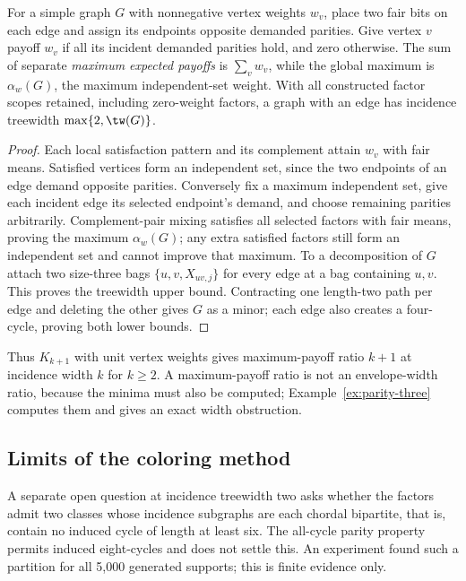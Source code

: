 \begin{proposition}\label{prop:independent-payoffs}
For a simple graph $G$ with nonnegative vertex weights $w_v$, place two
fair bits on each edge and assign its endpoints opposite demanded
parities. Give vertex $v$ payoff $w_v$ if all its incident demanded
parities hold, and zero otherwise. The sum of separate \emph{maximum
expected payoffs} is $\sum_vw_v$, while the global maximum is
$\alpha_w(G)$, the maximum independent-set weight. With all constructed
factor scopes retained, including zero-weight factors, a graph with
an edge has incidence treewidth $\max\{2,\tw(G)\}$.
\end{proposition}
\begin{proof}
Each local satisfaction pattern and its complement attain $w_v$ with
fair means. Satisfied vertices form an independent set, since the two
endpoints of an edge demand opposite parities. Conversely fix a maximum
independent set, give each incident edge its selected endpoint's demand,
and choose remaining parities arbitrarily. Complement-pair mixing
satisfies all selected factors with fair means, proving the maximum
$\alpha_w(G)$; any extra satisfied factors still form an independent
set and cannot improve that maximum.
To a decomposition of $G$ attach two size-three bags $\{u,v,X_{uv,j}\}$
for every edge at a bag containing $u,v$. This proves the treewidth
upper bound. Contracting one length-two path per edge and deleting
the other gives $G$ as a minor; each edge also creates a four-cycle,
proving both lower bounds.
\end{proof}
Thus $K_{k+1}$ with unit vertex weights gives maximum-payoff ratio $k+1$
at incidence width $k$ for $k\ge2$. A maximum-payoff ratio is not an
envelope-width ratio, because the minima must also be computed;
Example~\ref{ex:parity-three} computes them and gives an exact width
obstruction.

\subsection{Limits of the coloring method}\label{subsec:width-three-boundary}
A separate open question at incidence treewidth two asks whether the
factors admit two classes whose incidence subgraphs are each chordal
bipartite, that is, contain no induced cycle of length at least six.
The all-cycle parity property permits induced eight-cycles and does not
settle this. An experiment found such a partition for all 5,000
generated supports; this is finite evidence only.

